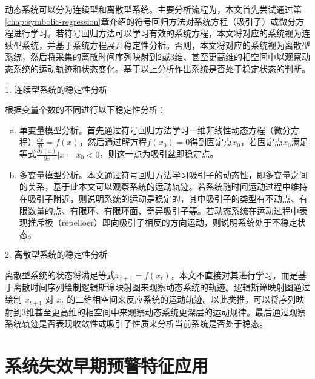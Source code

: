 动态系统可以分为连续型和离散型系统。主要分析流程为，本文首先尝试通过第\ref{chap:symbolic-regression}章介绍的符号回归方法对系统方程（吸引子）或微分方程进行学习。若符号回归方法可以学习有效的系统方程，本文将对应的系统视为连续型系统，并基于系统方程展开稳定性分析。否则，本文将对应的系统视为离散型系统，然后将采集的离散时间序列映射到2或3维、甚至更高维的相空间中以观察动态系统的运动轨迹和状态变化。基于以上分析作出系统是否处于稳定状态的判断。

1. 连续型系统的稳定性分析

根据变量个数的不同进行以下稳定性分析：
\begin{enumerate}[a.]
  \item 单变量模型分析。首先通过符号回归方法学习一维非线性动态方程（微分方程）$\frac{dx}{dt} = f(x)$，然后通过解方程$f(x_{0})=0$得到固定点$x_{0}$，若固定点$x_{0}$满足等式$\frac{\partial f(x)}{\partial x} | x=x_{0} < 0$，则这一点为吸引盆即稳定点。
  \item 多变量模型分析。本文通过符号回归方法学习吸引子的动态性，即多变量之间的关系，基于此本文可以观察系统的运动轨迹。若系统随时间运动过程中维持在吸引子附近，则说明系统的运动是稳定的，其中吸引子的类型有不动点、有限数量的点、有限环、有限环面、奇异吸引子等。若动态系统在运动过程中表现推斥极（repelloer）即向吸引子相反的方向运动，则说明系统处于不稳定状态。
\end{enumerate}

2. 离散型系统的稳定性分析

离散型系统的状态将满足等式$x_{t+1} = f(x_{t})$，本文不直接对其进行学习，而是基于离散时间序列绘制逻辑斯谛映射图来观察动态系统的轨迹。逻辑斯谛映射图通过绘制 $x_{t+1}$ 对 $x_{t}$ 的二维相空间来反应系统的运动轨迹。以此类推，可以将序列映射到3维甚至更高维的相空间中来观察动态系统更深层的运动规律。最后通过观察系统轨迹是否表现收敛性或吸引子性质来分析当前系统是否处于稳态。

\section{系统失效早期预警特征应用}
\label{sec:csd-application}

